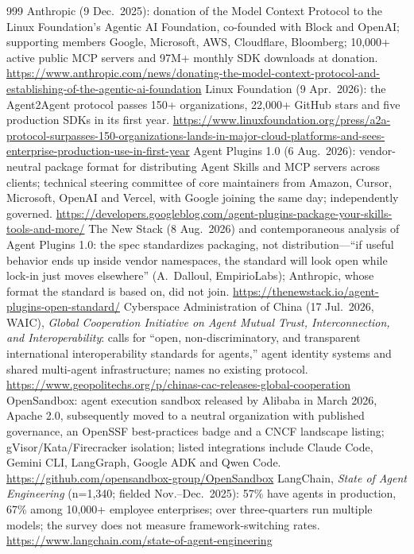 \begin{thebibliography}{999}
 Anthropic (9 Dec.\ 2025): donation of the Model Context Protocol to the Linux Foundation's Agentic AI Foundation, co-founded with Block and OpenAI; supporting members Google, Microsoft, AWS, Cloudflare, Bloomberg; 10,000+ active public MCP servers and 97M+ monthly SDK downloads at donation. \url{https://www.anthropic.com/news/donating-the-model-context-protocol-and-establishing-of-the-agentic-ai-foundation}
 Linux Foundation (9 Apr.\ 2026): the Agent2Agent protocol passes 150+ organizations, 22,000+ GitHub stars and five production SDKs in its first year. \url{https://www.linuxfoundation.org/press/a2a-protocol-surpasses-150-organizations-lands-in-major-cloud-platforms-and-sees-enterprise-production-use-in-first-year}
 Agent Plugins 1.0 (6 Aug.\ 2026): vendor-neutral package format for distributing Agent Skills and MCP servers across clients; technical steering committee of core maintainers from Amazon, Cursor, Microsoft, OpenAI and Vercel, with Google joining the same day; independently governed. \url{https://developers.googleblog.com/agent-plugins-package-your-skills-tools-and-more/}
 The New Stack (8 Aug.\ 2026) and contemporaneous analysis of Agent Plugins 1.0: the spec standardizes packaging, not distribution---``if useful behavior ends up inside vendor namespaces, the standard will look open while lock-in just moves elsewhere'' (A.~Dalloul, EmpirioLabs); Anthropic, whose format the standard is based on, did not join. \url{https://thenewstack.io/agent-plugins-open-standard/}
 Cyberspace Administration of China (17 Jul.\ 2026, WAIC), \emph{Global Cooperation Initiative on Agent Mutual Trust, Interconnection, and Interoperability}: calls for ``open, non-discriminatory, and transparent international interoperability standards for agents,'' agent identity systems and shared multi-agent infrastructure; names no existing protocol. \url{https://www.geopolitechs.org/p/chinas-cac-releases-global-cooperation}
 OpenSandbox: agent execution sandbox released by Alibaba in March 2026, Apache 2.0, subsequently moved to a neutral organization with published governance, an OpenSSF best-practices badge and a CNCF landscape listing; gVisor/Kata/Firecracker isolation; listed integrations include Claude Code, Gemini CLI, LangGraph, Google ADK and Qwen Code. \url{https://github.com/opensandbox-group/OpenSandbox}
 LangChain, \emph{State of Agent Engineering} (n=1,340; fielded Nov.--Dec.\ 2025): 57\% have agents in production, 67\% among 10,000+ employee enterprises; over three-quarters run multiple models; the survey does not measure framework-switching rates. \url{https://www.langchain.com/state-of-agent-engineering}

\end{thebibliography}
